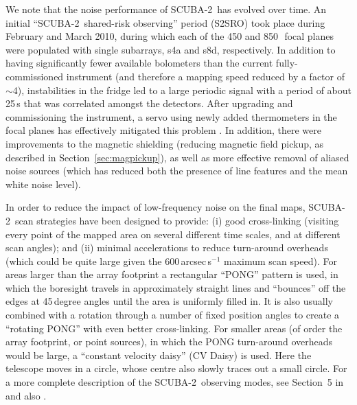 \documentclass[useAMS,usenatbib,nofootinbib]{mn2e}
\newcommand{\scuba}{SCUBA-2}
\begin{document}
We note that the noise performance of \scuba\ has evolved over
time. An initial ``\scuba\ shared-risk observing'' period (S2SRO) took
place during February and March 2010, during which each of the 450 and
850\,\micron\ focal planes were populated with single subarrays, s4a
and s8d, respectively. In addition to having significantly fewer
available bolometers than the current fully-commissioned instrument
(and therefore a mapping speed reduced by a factor of $\sim$4),
instabilities in the fridge led to a large periodic signal with a
period of about 25\,s that was correlated amongst the detectors. After
upgrading and commissioning the instrument, a servo using newly added
thermometers in the focal planes has effectively mitigated this
problem \citep[Section~2.5 in][]{holland2012}. In addition, there were
improvements to the magnetic shielding (reducing magnetic field
pickup, as described in Section~\ref{sec:magpickup}), as well as more
effective removal of aliased noise sources (which has reduced both the
presence of line features and the mean white noise level).

In order to reduce the impact of low-frequency noise on the final
maps, \scuba\ scan strategies have been designed to provide: (i) good
cross-linking (visiting every point of the mapped area on several
different time scales, and at different scan angles); and (ii) minimal
accelerations to reduce turn-around overheads (which could be quite
large given the 600\,arcsec\,s$^{-1}$ maximum scan speed). For areas
larger than the array footprint a rectangular ``PONG'' pattern is
used, in which the boresight travels in approximately straight lines
and ``bounces'' off the edges at 45\,degree angles until the area is
uniformly filled in. It is also usually combined with a rotation
through a number of fixed position angles to create a ``rotating
PONG'' with even better cross-linking. For smaller areas (of order the
array footprint, or point sources), in which the PONG turn-around
overheads would be large, a ``constant velocity daisy'' (CV Daisy) is
used.  Here the telescope moves in a circle, whose centre also slowly
traces out a small circle. For a more complete description of the
\scuba\ observing modes, see Section~5 in \citet{holland2012} and also
\citet{2010SPIE.7740E..66K}.
\end{document}
